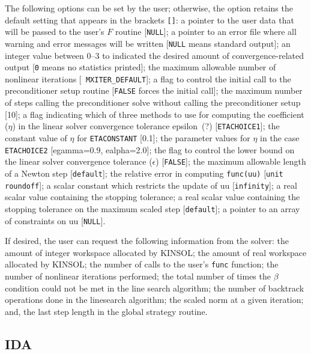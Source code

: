 The following options can be set by the user; otherwise, the option
retains the default setting that appears in the brackets {\tt []}:
a pointer to the user data that will be passed to the user's $F$
routine [{\tt NULL}]; a pointer to an error file where all
warning and error messages will be written [{\tt NULL} means standard
output]; an integer value between 0--3 to indicated the desired amount
of convergence-related output [{\tt 0} means no statistics printed];
the maximum allowable number of nonlinear iterations [{\tt
MXITER\_DEFAULT}]; a flag to control the initial call to the
preconditioner setup routine [{\tt FALSE} forces the initial call];
the maximum number of steps calling the preconditioner solve without
calling the preconditioner setup [10]; a flag indicating which of
three methods to use for computing the coefficient ($\eta$) in the linear
solver convergence tolerance epsilon~(?) [{\tt ETACHOICE1}]; the
constant value of $\eta$ for {\tt ETACONSTANT} [0.1]; the parameter
values for $\eta$ in the case {\tt ETACHOICE2} [egamma=0.9,
ealpha=2.0]; the flag to control the lower bound on the linear solver
convergence tolerance ($\epsilon$) [{\tt FALSE}]; the maximum
allowable length of a Newton step [{\tt default}]; the relative error
in computing {\tt func(uu)} [{\tt unit roundoff}]; a scalar constant
which restricts the update of uu [{\tt infinity}]; a real scalar value
containing the stopping tolerance; a real scalar value containing the
stopping tolerance on the maximum scaled step [{\tt default}]; a
pointer to an array of constraints on uu [{\tt NULL}].

If desired, the user can request the following information from the
solver: the amount of integer workspace allocated by KINSOL; the
amount of real workspace allocated by KINSOL; the number of calls to
the user's {\tt func} function; the number of nonlinear iterations
performed; the total number of times the $\beta$ condition could not
be met in the line search algorithm; the number of backtrack
operations done in the linesearch algorithm; the scaled norm at a
given iteration; and, the last step length in the global strategy
routine.

\subsection{IDA} 
\label{ss:IDA_usage}

